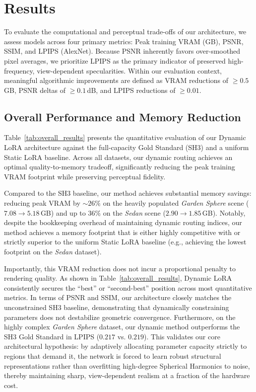 \documentclass[sigconf]{acmart}
\begin{document}
\section{Results}
\label{sec:results}
To evaluate the computational and perceptual trade-offs of our architecture, we 
assess models across four primary metrics: Peak training VRAM (GB), PSNR, SSIM, 
and LPIPS (AlexNet). Because PSNR inherently favors over-smoothed pixel 
averages, we prioritize LPIPS as the primary indicator of preserved 
high-frequency, view-dependent specularities. Within our evaluation context, 
meaningful algorithmic improvements are defined as VRAM reductions of 
$\ge0.5$\,GB, PSNR deltas of $\ge0.1$\,dB, and LPIPS reductions of $\ge0.01$.

\subsection{Overall Performance and Memory Reduction}
Table~\ref{tab:overall_results} presents the quantitative evaluation of our 
Dynamic LoRA architecture against the full-capacity Gold Standard (SH3) and a 
uniform Static LoRA baseline. Across all datasets, our dynamic routing achieves 
an optimal quality-to-memory tradeoff, significantly reducing the peak training 
VRAM footprint while preserving perceptual fidelity.

Compared to the SH3 baseline, our method achieves substantial memory savings: 
reducing peak VRAM by $\sim26\%$ on the heavily populated 
\textit{Garden Sphere} scene ($7.08 \rightarrow 5.18$\,GB) and up to $36\%$ on 
the \textit{Sedan} scene ($2.90 \rightarrow 1.85$\,GB). Notably, despite the 
bookkeeping overhead of maintaining dynamic routing indices, our method 
achieves a memory footprint that is either highly competitive with or strictly 
superior to the uniform Static LoRA baseline (e.g., achieving the lowest 
footprint on the \textit{Sedan} dataset). 

Importantly, this VRAM reduction does not incur a proportional penalty to 
rendering quality. As shown in Table~\ref{tab:overall_results}, Dynamic LoRA 
consistently secures the ``best'' or ``second-best'' position across most 
quantitative metrics. In terms of PSNR and SSIM, our architecture closely 
matches the unconstrained SH3 baseline, demonstrating that dynamically 
constraining parameters does not destabilize geometric convergence. 
Furthermore, on the highly complex \textit{Garden Sphere} dataset, our dynamic 
method outperforms the SH3 Gold Standard in LPIPS ($0.217$ vs. $0.219$). This 
validates our core architectural hypothesis: by adaptively allocating parameter 
capacity strictly to regions that demand it, the network is forced to learn 
robust structural representations rather than overfitting high-degree Spherical 
Harmonics to noise, thereby maintaining sharp, view-dependent realism at a 
fraction of the hardware cost.
\end{document}
